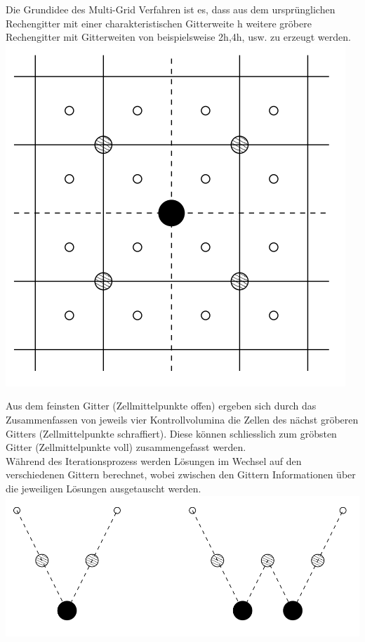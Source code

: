 \documentclass[a4paper]{scrartcl}
\begin{document}
Die Grundidee des Multi-Grid Verfahren ist es, dass aus dem ursprünglichen Rechengitter mit einer charakteristischen Gitterweite h weitere gröbere Rechengitter mit Gitterweiten von beispielsweise 2h,4h, usw. zu erzeugt werden. 
\\
\includegraphics[scale=0.3]{images/multigrid1.png}

Aus dem feinsten Gitter (Zellmittelpunkte offen) ergeben sich durch das Zusammenfassen von jeweils vier Kontrollvolumina die Zellen des nächst gröberen Gitters (Zellmittelpunkte schraffiert). Diese können schliesslich zum gröbsten Gitter (Zellmittelpunkte voll) zusammengefasst werden.
\\
Während des Iterationsprozess werden Lösungen im Wechsel auf den verschiedenen Gittern berechnet, wobei zwischen den Gittern Informationen über die jeweiligen Lösungen ausgetauscht werden.
\\
\includegraphics[scale=0.3]{images/multigrid2.png}
\end{document}

